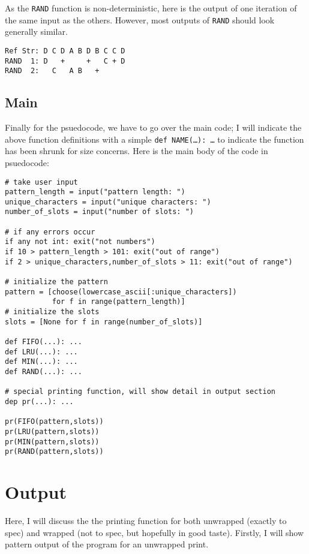 \documentclass[11pt]{article}
\begin{document}
As the \texttt{RAND} function is non-deterministic, here is the output of one iteration of the same input as the others.
However, most outputs of \texttt{RAND} should look generally similar.

\begin{lstlisting}
Ref Str: D C D A B D B C C D
RAND  1: D   +     +   C + D
RAND  2:   C   A B   +
\end{lstlisting}

\subsection{Main}

Finally for the psuedocode, we have to go over the main code; I will indicate the above function definitions with a simple \texttt{def NAME(\ldots): \ldots} to indicate the function has been shrunk for size concerns.
Here is the main body of the code in psuedocode:

\begin{lstlisting}
# take user input
pattern_length = input("pattern length: ")
unique_characters = input("unique characters: ")
number_of_slots = input("number of slots: ")

# if any errors occur
if any not int: exit("not numbers")
if 10 > pattern_length > 101: exit("out of range")
if 2 > unique_characters,number_of_slots > 11: exit("out of range")

# initialize the pattern
pattern = [choose(lowercase_ascii[:unique_characters])
           for f in range(pattern_length)]
# initialize the slots
slots = [None for f in range(number_of_slots)]

def FIFO(...): ...
def LRU(...): ...
def MIN(...): ...
def RAND(...): ...

# special printing function, will show detail in output section
dep pr(...): ...

pr(FIFO(pattern,slots))
pr(LRU(pattern,slots))
pr(MIN(pattern,slots))
pr(RAND(pattern,slots))

\end{lstlisting}

\section{Output}

Here, I will discuss the the printing function for both unwrapped (exactly to spec) and wrapped (not to spec, but hopefully in good taste).
Firstly, I will show pattern output of the program for an unwrapped print.
\end{document}
